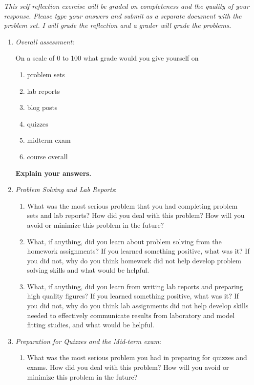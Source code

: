 \documentclass[12pt,letterpaper]{article}
\begin{document}
\emph{This self reflection exercise will be graded on completeness and the quality of your response. Please type your answers and submit as a separate document with the problem set.  I will grade the reflection and a grader will grade the problems.} 

\begin{enumerate}
\item \emph{Overall assessment}:

On a scale of 0 to 100 what grade would you give yourself on

\begin{enumerate}
\item problem sets
\item lab reports
\item blog posts
\item quizzes
\item midterm exam
\item course overall
\end{enumerate}

\textbf{Explain your answers.}

\item \emph{Problem Solving and Lab Reports}:
\begin{enumerate}
\item What was the most serious problem that you had completing problem sets and lab reports? How did you deal with this problem?  How will you avoid or minimize this problem in the future?

\item What, if anything, did you learn about problem solving from the homework assignments?  If you learned something positive, what was it?  If you did not, why do you think homework did not help develop problem solving skills and what would be helpful.  

\item What, if anything, did you learn from writing lab reports and preparing high quality figures?  If you learned something positive, what was it?  If you did not, why do you think lab assignments did not help develop skills needed to effectively communicate results from laboratory and model fitting studies, and what would be helpful.    
\end{enumerate}

\item \emph{Preparation for Quizzes and the Mid-term exam}:
\begin{enumerate}
\item What was the most serious problem you had in preparing for quizzes and exams.  How did you deal with this problem?  How will you avoid or minimize this problem in the future?
\end{enumerate}
\end{enumerate}
\end{document}
